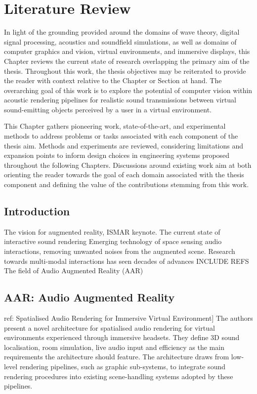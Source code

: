 \chapter{Literature Review}\label{ch:litReview}%
In light of the grounding provided around the domains of wave theory, digital signal processing, acoustics and soundfield simulations, as well as domains of computer graphics and vision, virtual environments, and immersive displays, this Chapter reviews the current state of research overlapping the primary aim of the thesis. Throughout this work, the thesis objectives may be reiterated to provide the reader with context relative to the Chapter or Section at hand. The overarching goal of this work is to explore the potential of computer vision within acoustic rendering pipelines for realistic sound transmissions between virtual sound-emitting objects perceived by a user in a virtual environment.\par
This Chapter gathers pioneering work, state-of-the-art, and experimental methods to address problems or tasks associated with each component of the thesis aim. Methods and experiments are reviewed, considering limitations and expansion points to inform design choices in engineering systems proposed throughout the following Chapters. Discussions around existing work aim at both orienting the reader towards the goal of each domain associated with the thesis component and defining the value of the contributions stemming from this work.\par

\section{Introduction}
The vision for augmented reality, ISMAR keynote.
The current state of interactive sound rendering
Emerging technology of space sensing
\cite{yang2022audio} audio interactions, removing unwanted noises from the augmented scene. Research towards multi-modal interactions has seen decades of advances INCLUDE REFS The field of Audio Augmented Reality (AAR) 


\section{AAR: Audio Augmented Reality}
ref: Spatialised Audio Rendering for Immersive Virtual Environment]
The authors present a novel architecture for spatialised audio rendering for virtual environments experienced through immersive headsets. They define 3D sound localisation, room simulation, live audio input and efficiency as the main requirements the architecture should feature. The architecture draws from low-level rendering pipelines, such as graphic sub-systems, to integrate sound rendering procedures into existing scene-handling systems adopted by these pipelines. 


